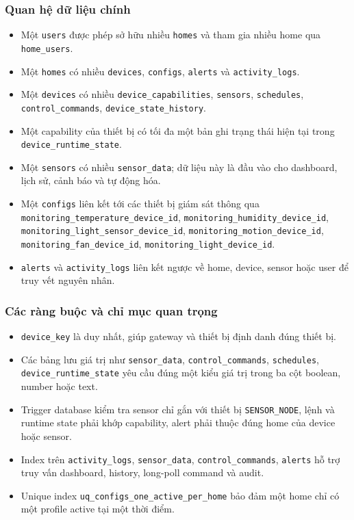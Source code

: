 \subsubsection{Quan hệ dữ liệu chính}

\begin{itemize}
    \item Một \texttt{users} được phép sở hữu nhiều \texttt{homes} và tham gia nhiều home qua \texttt{home\_users}.
    \item Một \texttt{homes} có nhiều \texttt{devices}, \texttt{configs}, \texttt{alerts} và \texttt{activity\_logs}.
    \item Một \texttt{devices} có nhiều \texttt{device\_capabilities}, \texttt{sensors}, \texttt{schedules}, \texttt{control\_commands}, \texttt{device\_state\_history}.
    \item Một capability của thiết bị có tối đa một bản ghi trạng thái hiện tại trong \texttt{device\_runtime\_state}.
    \item Một \texttt{sensors} có nhiều \texttt{sensor\_data}; dữ liệu này là đầu vào cho dashboard, lịch sử, cảnh báo và tự động hóa.
    \item Một \texttt{configs} liên kết tới các thiết bị giám sát thông qua \texttt{monitoring\_temperature\_device\_id}, \texttt{monitoring\_humidity\_device\_id}, \texttt{monitoring\_light\_sensor\_device\_id}, \texttt{monitoring\_motion\_device\_id}, \texttt{monitoring\_fan\_device\_id}, \texttt{monitoring\_light\_device\_id}.
    \item \texttt{alerts} và \texttt{activity\_logs} liên kết ngược về home, device, sensor hoặc user để truy vết nguyên nhân.
\end{itemize}

\subsubsection{Các ràng buộc và chỉ mục quan trọng}

\begin{itemize}
    \item \texttt{device\_key} là duy nhất, giúp gateway và thiết bị định danh đúng thiết bị.
    \item Các bảng lưu giá trị như \texttt{sensor\_data}, \texttt{control\_commands}, \texttt{schedules}, \texttt{device\_runtime\_state} yêu cầu đúng một kiểu giá trị trong ba cột boolean, number hoặc text.
    \item Trigger database kiểm tra sensor chỉ gắn với thiết bị \texttt{SENSOR\_NODE}, lệnh và runtime state phải khớp capability, alert phải thuộc đúng home của device hoặc sensor.
    \item Index trên \texttt{activity\_logs}, \texttt{sensor\_data}, \texttt{control\_commands}, \texttt{alerts} hỗ trợ truy vấn dashboard, history, long-poll command và audit.
    \item Unique index \texttt{uq\_configs\_one\_active\_per\_home} bảo đảm một home chỉ có một profile active tại một thời điểm.
\end{itemize}

